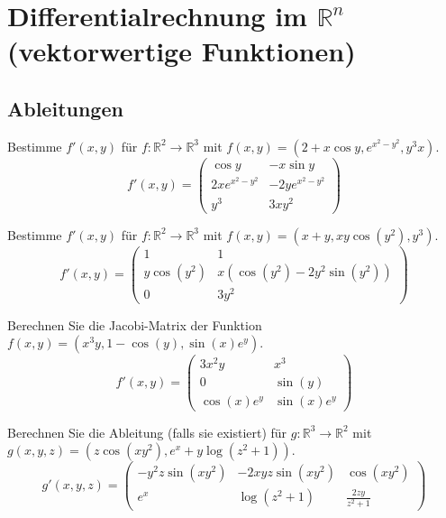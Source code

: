 \section{Differentialrechnung im $\mathbb{R}^n$ (vektorwertige Funktionen)}
\subsection{Ableitungen}
Bestimme $f'(x,y)$ für $f : \mathbb{R}^2 \to \mathbb{R}^3$ mit $f(x,y) = (2 + x \cos y, e^{x^2 - y^2}, y^3 x)$.
\begin{displaymath}
  f'(x,y) = 
  \begin{pmatrix}
    \cos y & -x \sin y\\
    2x e^{x^2 - y^2} & -2y e^{x^2 - y^2}\\
    y^3 & 3xy^2
  \end{pmatrix}
\end{displaymath}

Bestimme $f'(x,y)$ für $f : \mathbb{R}^2 \to \mathbb{R}^3$ mit $f(x,y) = (x + y, xy\cos(y^2), y^3)$.
\begin{displaymath}
  f'(x,y) = 
  \begin{pmatrix}
    1 & 1\\
    y\cos(y^2) & x(\cos(y^2) - 2y^2\sin(y^2))\\
    0 & 3y^2
  \end{pmatrix}
\end{displaymath}

Berechnen Sie die Jacobi-Matrix der Funktion $f(x,y) = (x^3y, 1 - \cos(y), \sin(x)e^y)$.
\begin{displaymath}
  f'(x,y) =
  \begin{pmatrix}
    3x^2y & x^3\\
    0 & \sin(y)\\
    \cos(x)e^y & \sin(x)e^y
  \end{pmatrix}
\end{displaymath}

Berechnen Sie die Ableitung (falls sie existiert) für $g : \mathbb{R}^3 \to \mathbb{R}^2$ mit $g(x,y,z) = (z \cos(xy^2), e^x + y \log(z^2 + 1))$.
\begin{displaymath}
  g'(x,y,z) = 
  \begin{pmatrix}
    -y^2z \sin(xy^2) & -2xyz \sin(xy^2) & \cos(xy^2)\\
    e^x & \log(z^2 + 1) & \frac{2zy}{z^2 + 1}
  \end{pmatrix}
\end{displaymath}

